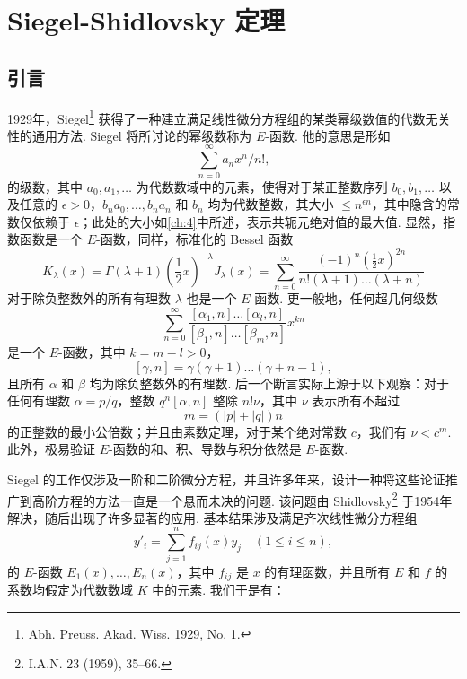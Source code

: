 
\chapter{Siegel-Shidlovsky 定理}\label{ch:11}

\section{引言}\label{sec:ch11_1}

1929年，Siegel\footnote{Abh. Preuss. Akad. Wiss. 1929, No. 1.} 获得了一种建立满足线性微分方程组的某类幂级数值的代数无关性的通用方法. Siegel 将所讨论的幂级数称为 $E$-函数. 他的意思是形如
\[\sum_{n=0}^{\infty} a_n x^n / n!,\]
的级数，其中 $a_0, a_1, \ldots$ 为代数数域中的元素，使得对于某正整数序列 $b_0, b_1, \ldots$ 以及任意的 $\epsilon > 0$，$b_n a_0, \ldots, b_n a_n$ 和 $b_n$ 均为代数整数，其大小 $\leqslant n^{\epsilon n}$，其中隐含的常数仅依赖于 $\epsilon$；此处的大小如\autoref{ch:4}中所述，表示共轭元绝对值的最大值. 显然，指数函数是一个 $E$-函数，同样，标准化的 Bessel 函数
\[K_{\lambda}(x) = \Gamma(\lambda+1) (\frac{1}{2}x)^{-\lambda} J_{\lambda}(x) = \sum_{n=0}^{\infty} \frac{(-1)^n (\frac{1}{2}x)^{2n}}{n! (\lambda+1) \dots (\lambda+n)}\]
对于除负整数外的所有有理数 $\lambda$ 也是一个 $E$-函数. 更一般地，任何超几何级数
\[\sum_{n=0}^{\infty} \frac{[\alpha_1, n] \dots [\alpha_l, n]}{[\beta_1, n] \dots [\beta_m, n]} x^{kn}\]
是一个 $E$-函数，其中 $k = m - l > 0$，
\[[\gamma, n] = \gamma(\gamma+1) \dots (\gamma+n-1),\]
且所有 $\alpha$ 和 $\beta$ 均为除负整数外的有理数. 后一个断言实际上源于以下观察：对于任何有理数 $\alpha = p/q$，整数 $q^n[\alpha, n]$ 整除 $n! \nu$，其中 $\nu$ 表示所有不超过
\[m = (|p| + |q|) n\]
的正整数的最小公倍数；并且由素数定理，对于某个绝对常数 $c$，我们有 $\nu < c^m$. 此外，极易验证 $E$-函数的和、积、导数与积分依然是 $E$-函数.

Siegel 的工作仅涉及一阶和二阶微分方程，并且许多年来，设计一种将这些论证推广到高阶方程的方法一直是一个悬而未决的问题. 该问题由 Shidlovsky\footnote{I.A.N. 23 (1959), 35--66.} 于1954年解决，随后出现了许多显著的应用. 基本结果涉及满足齐次线性微分方程组
\[y'_{i} = \sum_{j=1}^{n} f_{ij}(x) y_{j} \quad (1 \leq i \leq n), \tag{1}\label{eq:ch11_1}\]
的 $E$-函数 $E_1(x), \dots, E_n(x)$，其中 $f_{ij}$ 是 $x$ 的有理函数，并且所有 $E$ 和 $f$ 的系数均假定为代数数域 $K$ 中的元素. 我们于是有：

